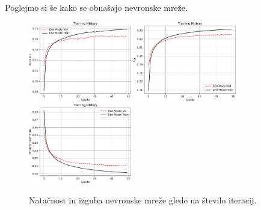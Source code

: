 Poglejmo si še kako se obnašajo nevronske mreže.
\begin{figure}
    \centering
    \includegraphics[width=0.40\textwidth]{../pdf/nn/training_history-accuracy.pdf}
    \includegraphics[width=0.40\textwidth]{../pdf/nn/training_history-AUC.pdf}
    \includegraphics[width=0.40\textwidth]{../pdf/nn/training_history-binary_crossentropy.pdf}
    \caption{Natačnost in izguba nevronske mreže glede na število iteracij.\label{fig:nn-accuracy-loss}}
\end{figure}

